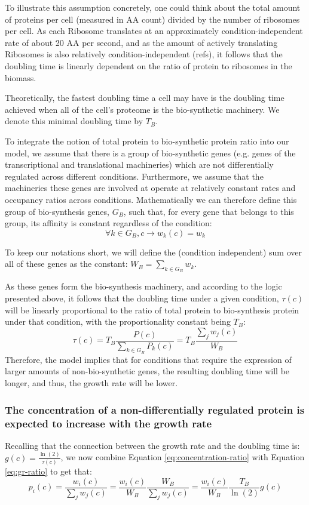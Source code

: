 \documentclass[notitlepage]{article}
\begin{document}
To illustrate this assumption concretely, one could think about the total amount of proteins per cell (measured in AA count) divided by the number of ribosomes per cell.
As each Ribosome translates at an approximately condition-independent rate of about 20 AA per second, and as the amount of actively translating Ribosomes is also relatively condition-independent (refs), it follows that the doubling time is linearly dependent on the ratio of protein to ribosomes in the biomass.

Theoretically, the fastest doubling time a cell may have is the doubling time achieved when all of the cell's proteome is the bio-synthetic machinery.
We denote this minimal doubling time by $T_B$.

To integrate the notion of total protein to bio-synthetic protein ratio into our model, we assume that there is a group of bio-synthetic genes (e.g. genes of the transcriptional and translational machineries) which are not differentially regulated across different conditions.
Furthermore, we assume that the machineries these genes are involved at operate at relatively constant rates and occupancy ratios across conditions.
Mathematically we can therefore define this group of bio-synthesis genes, $G_B$, such that, for every gene that belongs to this group, its affinity is constant regardless of the condition:
\begin{equation}
  \label{eq:biosynth-def}
  \forall k \in G_B, c \rightarrow w_k(c)=w_k
\end{equation}

To keep our notations short, we will define the (condition independent) sum over all of these genes as the constant: $W_B = \sum_{k\in G_B}w_k$.

As these genes form the bio-synthesis machinery, and according to the logic presented above, it follows that the doubling time under a given condition, $\tau(c)$ will be linearly proportional to the ratio of total protein to bio-synthesis protein under that condition, with the proportionality constant being $T_B$:
\begin{equation}
  \label{eq:gr-ratio}
  \tau(c) = T_B\frac{P(c)}{\sum_{k\in G_B}P_k(c)}=T_B\frac{\sum_jw_j(c)}{W_B}
\end{equation}
Therefore, the model implies that for conditions that require the expression of larger amounts of non-bio-synthetic genes, the resulting doubling time will be longer, and thus, the growth rate will be lower.

\subsubsection{The concentration of a non-differentially regulated protein is expected to increase with the growth rate} 
Recalling that the connection between the growth rate and the doubling time is: $g(c)=\frac{\ln(2)}{\tau(c)}$, we now combine Equation \ref{eq:concentration-ratio} with Equation \ref{eq:gr-ratio} to get that:
\begin{equation}
  \label{eq:default-response}
  p_i(c)=\frac{w_i(c)}{\sum_jw_j(c)}=\frac{w_i(c)}{W_B}\frac{W_B}{\sum_jw_j(c)}=\frac{w_i(c)}{W_B}\frac{T_B}{\ln(2)}g(c)
\end{equation}
\end{document}
